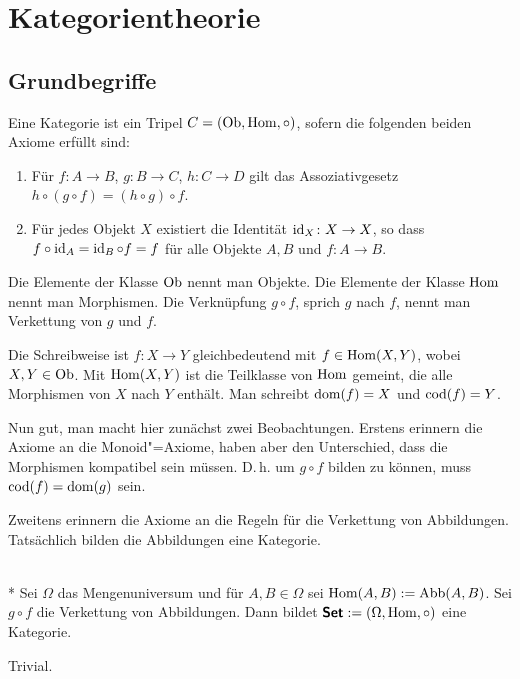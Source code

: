 
\chapter{Kategorientheorie}

\section{Grundbegriffe}

\begin{Definition}[Kategorie]
Eine Kategorie ist ein Tripel $C = (\operatorname{Ob},\operatorname{Hom},{\circ})$,
sofern die folgenden beiden Axiome erfüllt sind:
\begin{enumerate}
\item Für $f\colon A\to B$, $g\colon B\to C$, $h\colon C\to D$ gilt
das Assoziativgesetz\\
$h\circ (g\circ f) = (h\circ g)\circ f$.
\item Für jedes Objekt $X$ existiert die Identität $\operatorname{id}_X\colon X\to X$,
so dass $f\circ\operatorname{id}_A = \operatorname{id}_B\circ f=f$ für alle Objekte $A,B$
und $f\colon A\to B$.
\end{enumerate}
\end{Definition}
Die Elemente der Klasse $\operatorname{Ob}$ nennt man Objekte. Die
Elemente der Klasse $\operatorname{Hom}$ nennt man Morphismen. Die
Verknüpfung $g\circ f$, sprich $g$ nach $f$, nennt man Verkettung
von $g$ und $f$.

Die Schreibweise ist $f\colon X\to Y$ gleichbedeutend mit
$f\in\operatorname{Hom}(X,Y)$, wobei $X,Y\in\operatorname{Ob}$.
Mit $\operatorname{Hom}(X,Y)$ ist die Teilklasse von
$\operatorname{Hom}$ gemeint, die alle Morphismen von $X$ nach $Y$
enthält. Man schreibt $\operatorname{dom}(f) = X$ und $\operatorname{cod}(f) = Y$.

Nun gut, man macht hier zunächst zwei Beobachtungen. Erstens
erinnern die Axiome an die Monoid"=Axiome, haben aber den Unterschied,
dass die Morphismen kompatibel sein müssen. D.\,h. um $g\circ f$
bilden zu können, muss $\operatorname{cod}(f)=\operatorname{dom}(g)$ sein.

Zweitens erinnern die Axiome an die Regeln für die Verkettung
von Abbildungen. Tatsächlich bilden die Abbildungen eine Kategorie.

\begin{Satz}\mbox{}\\*
Sei $\Omega$ das Mengenuniversum und für $A,B\in\Omega$ sei
$\operatorname{Hom}(A,B):=\operatorname{Abb}(A,B)$. Sei $g\circ f$ die Verkettung
von Abbildungen. Dann bildet $\textsf{\textbf{Set}}:=(\Omega,\operatorname{Hom},\circ)$
eine Kategorie.
\end{Satz}
 Trivial.\;\qedsymbol

